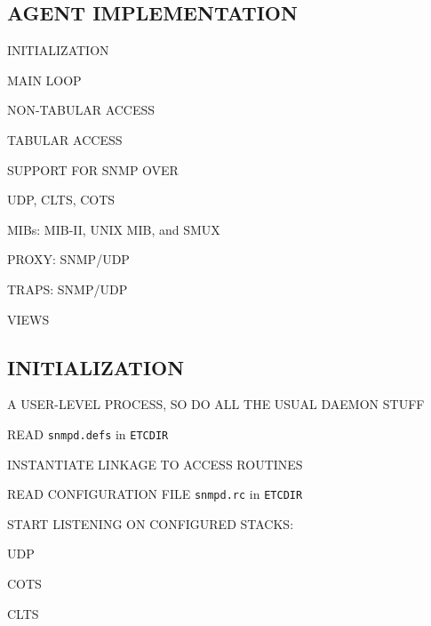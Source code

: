 \begin{bwslide}
\part	{AGENT IMPLEMENTATION}\bf

\begin{nrtc}
\item	INITIALIZATION

\item	MAIN LOOP

\item	NON-TABULAR ACCESS

\item	TABULAR ACCESS
\end{nrtc}
\end{bwslide}


\begin{bwslide}

\begin{nrtc}
\item	SUPPORT FOR SNMP OVER
    \begin{nrtc}
    \item	UDP, CLTS, COTS
    \end{nrtc}

\item	MIBs: MIB-II, UNIX MIB, and SMUX

\item	PROXY: SNMP/UDP

\item	TRAPS: SNMP/UDP

\item	VIEWS
\end{nrtc}
\end{bwslide}


\begin{bwslide}
\part*	{INITIALIZATION}\bf

\begin{nrtc}
\item	A USER-LEVEL PROCESS, SO DO ALL THE USUAL DAEMON STUFF

\item	READ \verb"snmpd.defs" in \verb"ETCDIR"

\item	INSTANTIATE LINKAGE TO ACCESS ROUTINES

\item	READ CONFIGURATION FILE \verb"snmpd.rc" in \verb"ETCDIR"

\item	START LISTENING ON CONFIGURED STACKS:
    \begin{nrtc}
    \item	UDP

    \item	COTS

    \item	CLTS
    \end{nrtc}
\end{nrtc}
\end{bwslide}


